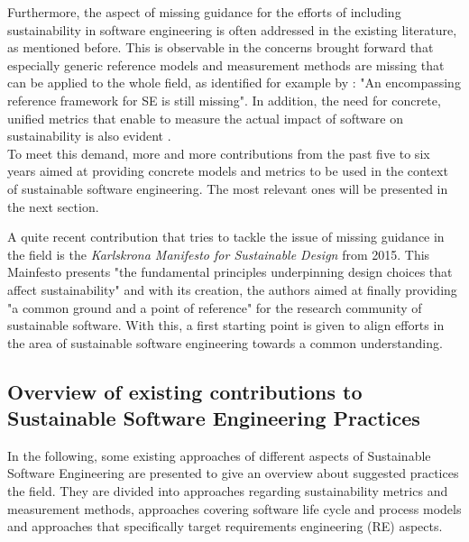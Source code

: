 \documentclass[oribibl]{llncs}
\begin{document}
Furthermore, the aspect of missing guidance for the efforts of including sustainability in software engineering is often addressed in the existing literature, as mentioned before. %
This is observable in the concerns brought forward that especially generic reference models and measurement methods are missing that can be applied to the whole field, as identified for example by \cite{penzenstadler_sustainability_2012}: "An encompassing reference framework for SE is still missing". %
In addition, the need for concrete, unified metrics that enable to measure the actual impact of software on sustainability is also evident %
.\\
To meet %
this demand, more and more contributions from the past five to six years aimed at providing concrete models and metrics to be used in the context of sustainable software engineering. The most relevant ones will be presented in the next section.


A quite recent contribution that tries to tackle the issue of missing guidance in the field is the \textit{Karlskrona Manifesto for Sustainable Design} \cite{karlskrona} from 2015. This Mainfesto presents "the fundamental principles underpinning design choices that affect sustainability" \cite{becker_sustainability_2015} 
and with its creation, the authors aimed at finally providing "a common ground and a point of reference"\cite{becker_sustainability_2015} for the research community of sustainable software. With this, a first starting point is given to align efforts in the area of sustainable software engineering towards a common understanding.   

\subsection{Overview of existing contributions to Sustainable Software Engineering Practices}%
In the following, some existing approaches of different aspects of Sustainable Software Engineering are presented to give an overview about suggested practices the field. They are divided into approaches regarding sustainability metrics and measurement methods, approaches covering software life cycle and process models and approaches that specifically target requirements engineering (RE) %
aspects. %
\end{document}

